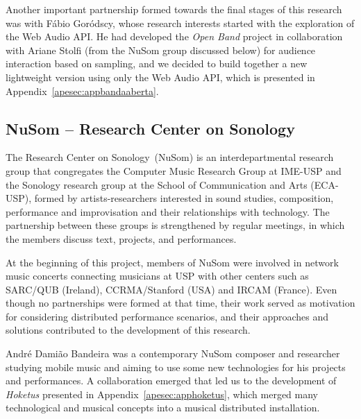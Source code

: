 Another important partnership formed towards the final stages of this research was with Fábio Goródscy, whose research interests started with the exploration of the Web Audio API.
He had developed the \textit{Open Band} project in collaboration with Ariane Stolfi (from the NuSom group discussed below) for audience interaction based on sampling, and we decided to build together a new lightweight version using only the Web Audio API, which is presented in Appendix~\ref{apesec:appbandaaberta}.


\subsection*{NuSom – Research Center on Sonology}

The Research Center on Sonology~(NuSom) is an interdepartmental research group that congregates the Computer Music Research Group at IME-USP and the Sonology research group at the School of Communication and Arts (ECA-USP), formed by artists-researchers interested in sound studies, composition,  performance and improvisation and their relationships with technology.
The partnership between these groups is strengthened by regular meetings, in which the members discuss text, projects, and performances.

At the beginning of this project, members of NuSom were involved in network music concerts connecting musicians at USP with other centers such as SARC/QUB (Ireland), CCRMA/Stanford (USA) and IRCAM (France).
Even though no partnerships were formed at that time, their work served as motivation for considering distributed performance scenarios, and their approaches and solutions contributed to the development of this research.

André Damião Bandeira was a contemporary NuSom composer and researcher studying mobile music and aiming to use some new technologies for his projects and performances.
A collaboration emerged that led us to the development of \textit{Hoketus} presented in Appendix~\ref{apesec:apphoketus}, which merged many technological and musical concepts into a musical distributed installation.



